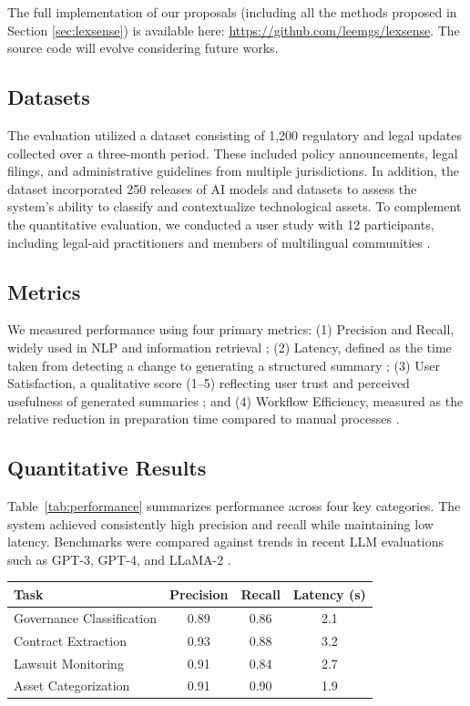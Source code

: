 {The full implementation of our proposals (including all the methods proposed in Section \ref{sec:lexsense}) is available here: \url{https://github.com/leemgs/lexsense}. The source code will evolve considering future works.

\subsection{Datasets}
The evaluation utilized a dataset consisting of 1,200 regulatory and legal updates collected over a three-month period. These included policy announcements, legal filings, and administrative guidelines from multiple jurisdictions. In addition, the dataset incorporated 250 releases of AI models and datasets to assess the system's ability to classify and contextualize technological assets. To complement the quantitative evaluation, we conducted a user study with 12 participants, including legal-aid practitioners and members of multilingual communities \cite{EUAIAct2024, chalkidis2022lexglue}.

\subsection{Metrics}
We measured performance using four primary metrics: (1) Precision and Recall, widely used in NLP and information retrieval \cite{devlin2019bert, raffel2020t5}; (2) Latency, defined as the time taken from detecting a change to generating a structured summary \cite{reimers2019sbert, lewis2020rag}; (3) User Satisfaction, a qualitative score (1–5) reflecting user trust and perceived usefulness of generated summaries \cite{mitchell2021modelcards, ouyang2022instructgpt}; and (4) Workflow Efficiency, measured as the relative reduction in preparation time compared to manual processes \cite{maynez2020faithfulness, gama2014drift}.


\subsection{Quantitative Results}
Table~\ref{tab:performance} summarizes performance across four key categories. The system achieved consistently high precision and recall while maintaining low latency. Benchmarks were compared against trends in recent LLM evaluations such as GPT-3, GPT-4, and LLaMA-2 \cite{brown2020gpt3, openai2023gpt4, touvron2023llama2}.
\begin{table}[t]
\centering
\small
\begin{tabular}{lccc}
\hline
\textbf{Task} & \textbf{Precision} & \textbf{Recall} & \textbf{Latency (s)} \\
\hline
Governance Classification & 0.89 & 0.86 & 2.1 \\
Contract Extraction       & 0.93 & 0.88 & 3.2 \\
Lawsuit Monitoring        & 0.91 & 0.84 & 2.7 \\
Asset Categorization      & 0.91 & 0.90 & 1.9 \\
\hline
\end{tabular}


\end{table}}
